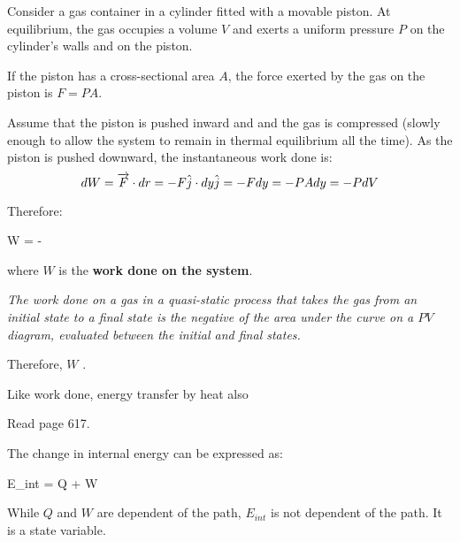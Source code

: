             \par Consider a gas container in a cylinder fitted with a movable piston. At
            equilibrium, the gas occupies a volume $V$ and exerts a uniform pressure $P$
            on the cylinder's walls and on the piston.
            \par If the piston has a cross-sectional area $A$, the force exerted by the
            gas on the piston is $F = PA$.
            \par Assume that the piston is pushed inward and and the gas is compressed
             (slowly enough to allow the system to remain in
            thermal equilibrium all the time). As the piston is pushed downward, the 
            instantaneous work done is:
            \begin{equation}
                dW = \overrightarrow{F} \cdot dr = -F \hat{j} \cdot dy \hat{j} = -Fdy = -PAdy = -PdV
            \end{equation}
            \par Therefore:
            \begin{eqbox}
                W = - 
            \end{eqbox}
            where $W$ is the \textbf{work done on the system}.
            \par \textit{The work done on a gas in a quasi-static process that takes the
            gas from an initial state to a final state is the negative of the area under 
            the curve on a $PV$ diagram, evaluated between the initial and final states.}
            \par Therefore, $W$ .
    \hiiEND
        \par Like work done, energy transfer by heat also 
        \par Read page 617.

    \par The change in internal energy can be expressed as:
    \begin{eqbox}
        \Dt E_{int} = Q + W
    \end{eqbox}
    \par While $Q$ and $W$ are dependent of the path, $E_{int}$ is not dependent of the
    path. It is a state variable.

